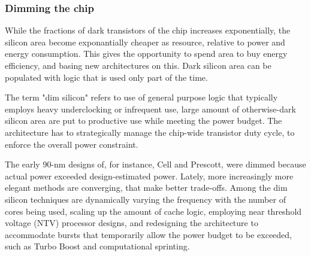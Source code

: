 

\subsubsection{Dimming the chip}
While the fractions of dark transistors of the chip increases exponentially, the silicon area become exponantially cheaper as resource, relative to power and energy consumption.
This gives the opportunity to spend area to buy energy efficiency, and basing new architectures on this.
Dark silicon area can be populated with logic that is used only part of the time.

The term "dim silicon" refers to use of general purpose logic that typically employs heavy underclocking or infrequent use, large amount of otherwise-dark silicon area are put to productive use while meeting the power budget.
The architecture has to strategically manage the chip-wide transistor duty cycle, to enforce the overall power constraint. 

The early 90-nm designs of, for instance, Cell and Prescott, were dimmed because actual power exceeded design-estimated power. 
Lately, more increasingly more elegant methods are converging, that make better trade-offs.
Among the dim silicon techniques are dynamically varying the frequency with the number of cores being used, scaling up the amount of cache logic, employing near threshold voltage (NTV) processor designs, and redesigning the architecture to accommodate bursts that temporarily allow the power budget to be exceeded, such as Turbo Boost and computational sprinting. \cite{dark-silicon}

